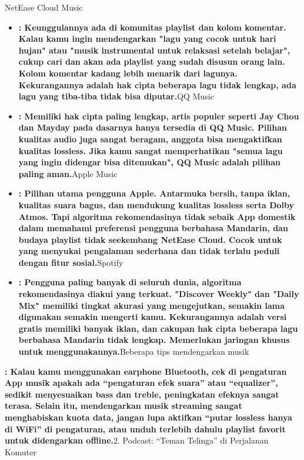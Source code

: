 


NetEase Cloud Music

\begin{itemize}
  \item \textbf{: Keunggulannya ada di komunitas playlist dan kolom komentar. Kalau kamu ingin mendengarkan "lagu yang cocok untuk hari hujan" atau "musik instrumental untuk relaksasi setelah belajar", cukup cari dan akan ada playlist yang sudah disusun orang lain. Kolom komentar kadang lebih menarik dari lagunya. Kekurangannya adalah hak cipta beberapa lagu tidak lengkap, ada lagu yang tiba-tiba tidak bisa diputar.}QQ Music
  \item \textbf{: Memiliki hak cipta paling lengkap, artis populer seperti Jay Chou dan Mayday pada dasarnya hanya tersedia di QQ Music. Pilihan kualitas audio juga sangat beragam, anggota bisa mengaktifkan kualitas lossless. Jika kamu sangat memperhatikan "semua lagu yang ingin didengar bisa ditemukan", QQ Music adalah pilihan paling aman.}Apple Music
  \item \textbf{: Pilihan utama pengguna Apple. Antarmuka bersih, tanpa iklan, kualitas suara bagus, dan mendukung kualitas lossless serta Dolby Atmos. Tapi algoritma rekomendasinya tidak sebaik App domestik dalam memahami preferensi pengguna berbahasa Mandarin, dan budaya playlist tidak seekembang NetEase Cloud. Cocok untuk yang menyukai pengalaman sederhana dan tidak terlalu peduli dengan fitur sosial.}Spotify
  \item \textbf{: Pengguna paling banyak di seluruh dunia, algoritma rekomendasinya diakui yang terkuat. "Discover Weekly" dan "Daily Mix" memiliki tingkat akurasi yang mengejutkan, semakin lama digunakan semakin mengerti kamu. Kekurangannya adalah versi gratis memiliki banyak iklan, dan cakupan hak cipta beberapa lagu berbahasa Mandarin tidak lengkap. Memerlukan jaringan khusus untuk menggunakannya.}Beberapa tips mendengarkan musik
\end{itemize}

\textbf{: Kalau kamu menggunakan earphone Bluetooth, cek di pengaturan App musik apakah ada “pengaturan efek suara” atau “equalizer”, sedikit menyesuaikan bass dan treble, peningkatan efeknya sangat terasa. Selain itu, mendengarkan musik streaming sangat menghabiskan kuota data, jangan lupa aktifkan “putar lossless hanya di WiFi” di pengaturan, atau unduh terlebih dahulu playlist favorit untuk didengarkan offline.}2. Podcast: “Teman Telinga” di Perjalanan Komuter


